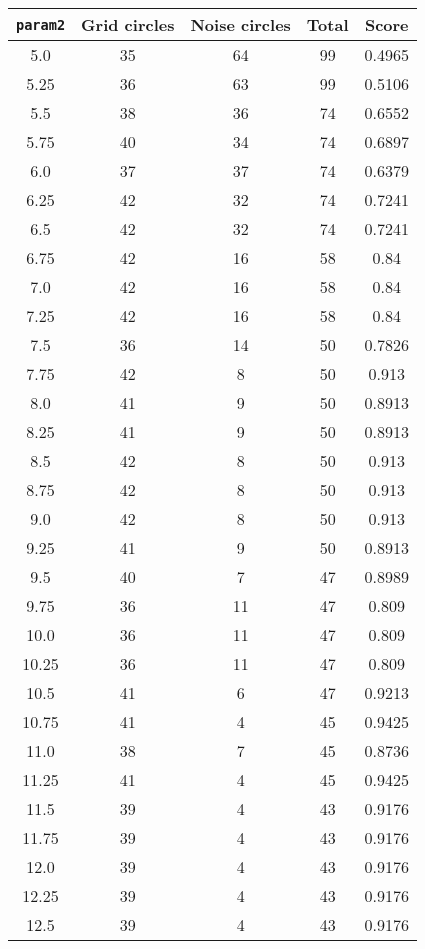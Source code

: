 \documentclass[letterpaper, 12pt]{article}
\begin{document}
\begin{longtable}{|c|c|c|c|c|}
\hline
\textbf{\texttt{param2}} & \textbf{Grid circles} & \textbf{Noise circles} & \textbf{Total} & \textbf{Score} \\
\hline
5.0 & 35 & 64 & 99 & 0.4965 \\
\hline
5.25 & 36 & 63 & 99 & 0.5106 \\
\hline
5.5 & 38 & 36 & 74 & 0.6552 \\
\hline
5.75 & 40 & 34 & 74 & 0.6897 \\
\hline
6.0 & 37 & 37 & 74 & 0.6379 \\
\hline
6.25 & 42 & 32 & 74 & 0.7241 \\
\hline
6.5 & 42 & 32 & 74 & 0.7241 \\
\hline
6.75 & 42 & 16 & 58 & 0.84 \\
\hline
7.0 & 42 & 16 & 58 & 0.84 \\
\hline
7.25 & 42 & 16 & 58 & 0.84 \\
\hline
7.5 & 36 & 14 & 50 & 0.7826 \\
\hline
7.75 & 42 & 8 & 50 & 0.913 \\
\hline
8.0 & 41 & 9 & 50 & 0.8913 \\
\hline
8.25 & 41 & 9 & 50 & 0.8913 \\
\hline
8.5 & 42 & 8 & 50 & 0.913 \\
\hline
8.75 & 42 & 8 & 50 & 0.913 \\
\hline
9.0 & 42 & 8 & 50 & 0.913 \\
\hline
9.25 & 41 & 9 & 50 & 0.8913 \\
\hline
9.5 & 40 & 7 & 47 & 0.8989 \\
\hline
9.75 & 36 & 11 & 47 & 0.809 \\
\hline
10.0 & 36 & 11 & 47 & 0.809 \\
\hline
10.25 & 36 & 11 & 47 & 0.809 \\
\hline
10.5 & 41 & 6 & 47 & 0.9213 \\
\hline
10.75 & 41 & 4 & 45 & 0.9425 \\
\hline
11.0 & 38 & 7 & 45 & 0.8736 \\
\hline
11.25 & 41 & 4 & 45 & 0.9425 \\
\hline
11.5 & 39 & 4 & 43 & 0.9176 \\
\hline
11.75 & 39 & 4 & 43 & 0.9176 \\
\hline
12.0 & 39 & 4 & 43 & 0.9176 \\
\hline
12.25 & 39 & 4 & 43 & 0.9176 \\
\hline
12.5 & 39 & 4 & 43 & 0.9176 \\

\end{longtable}
\end{document}
